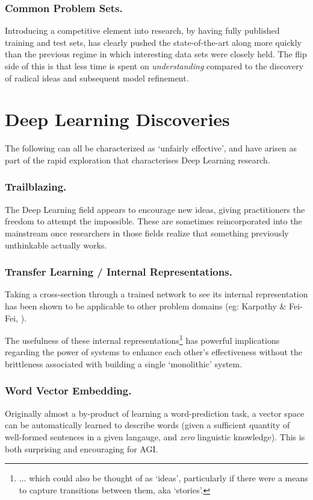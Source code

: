 \documentclass[citeauthoryear]{llncs}
\begin{document}
\subsubsection*{Common Problem Sets.}

Introducing a competitive element into research, by having fully published
training and test sets, has clearly pushed the state-of-the-art along more 
quickly than the previous regime in which interesting data sets were closely held.
The flip side of this is that less time is spent on \emph{understanding}
compared to the discovery of radical ideas and subsequent model refinement.


\section{Deep Learning Discoveries}

The following can all be characterized as `unfairly effective', and have 
arisen as part of the rapid exploration that characterises Deep Learning research.

\subsubsection*{Trailblazing.}
The Deep Learning field appears to encourage new ideas, giving 
practitioners the freedom to attempt the impossible.  
These are sometimes reincorporated into the mainstream once researchers in those 
fields realize that something previously unthinkable actually works.

\subsubsection*{Transfer Learning / Internal Representations.}
Taking a cross-section through a trained network to see its internal representation
has been shown to be applicable to other problem domains (eg: Karpathy \& Fei-Fei, \cite{karpathy2014deep}).

The usefulness of these internal representations\footnote{ 
... which could also be thought of as `ideas', particularly 
if there were a means to capture transitions between them, aka `stories'.}
has powerful implications regarding the power of systems to enhance 
each other's effectiveness without the 
brittleness associated with building a single `monolithic' system.

\subsubsection*{Word Vector Embedding.}
Originally almost a by-product of learning a word-prediction task, a vector 
space can be automatically learned to describe words (given a sufficient
quantity of well-formed sentences in a given langauge, and \emph{zero} linguistic knowledge).
This is both surprising and encouraging for AGI.
\end{document}
